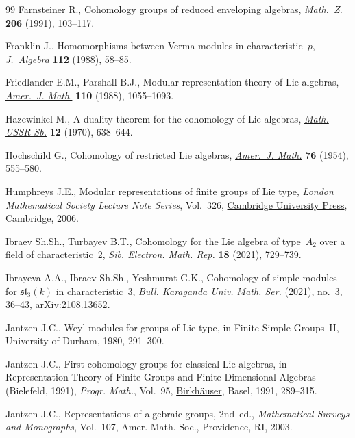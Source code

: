 \documentclass[10pt,a4paper]{amsart}
\numberwithin{equation}{section}
\begin{document}
\begin{thebibliography}{99}
Farnsteiner R., Cohomology groups of reduced enveloping algebras,
 \href{https://doi.org/10.1007/BF02571329}{\textit{Math.~Z.}} \textbf{206} (1991), 103--117.

Franklin J., Homomorphisms between {V}erma modules in characteristic~{$p$},
 \href{https://doi.org/10.1016/0021-8693(88)90132-9}{\textit{J.~Algebra}} \textbf{112} (1988), 58--85.

Friedlander E.M., Parshall B.J., Modular representation theory of {L}ie
 algebras, \href{https://doi.org/10.2307/2374686}{\textit{Amer.~J. Math.}} \textbf{110} (1988), 1055--1093.

Hazewinkel M., A duality theorem for the cohomology of Lie algebras,
 \href{https://doi.org/10.1070/SM1970v012n04ABEH000942}{\textit{Math. USSR-Sb.}} \textbf{12} (1970), 638--644.

Hochschild G., Cohomology of restricted {L}ie algebras, \href{https://doi.org/10.2307/2372701}{\textit{Amer.~J. Math.}}
 \textbf{76} (1954), 555--580.

Humphreys J.E., Modular representations of finite groups of {L}ie type,
 \textit{London Mathematical Society Lecture Note Series}, Vol.~326, \href{https://doi.org/10.1017/CBO9780511525940}{Cambridge
 University Press}, Cambridge, 2006.

Ibraev Sh.Sh., Turbayev B.T., Cohomology for the {L}ie algebra of type~{$A_2$}
 over a field of characteristic~2, \href{https://doi.org/10.33048/semi.2021.18.053}{\textit{Sib. Electron. Math. Rep.}}
 \textbf{18} (2021), 729--739.

Ibrayeva A.A., Ibraev Sh.Sh., Yeshmurat G.K., Cohomology of simple modules for
 $\mathfrak{sl}_3(k)$ in characteristic~$3$, \textit{Bull. Karaganda Univ. Math. Ser.} (2021), no.~3, 36--43, \href{https://arxiv.org/abs/2108.13652}{arXiv:2108.13652}.

Jantzen J.C., Weyl modules for groups of {L}ie type, in Finite Simple
 Groups~{II}, University of Durham, 1980, 291--300.

Jantzen J.C., First cohomology groups for classical {L}ie algebras, in
 Representation Theory of Finite Groups and Finite-Dimensional Algebras
 ({B}ielefeld, 1991), \textit{Progr. Math.}, Vol.~95, \href{https://doi.org/10.1007/978-3-0348-8658-1_11}{Birkh\"auser}, Basel,
 1991, 289--315.

Jantzen J.C., Representations of algebraic groups, 2nd~ed., \textit{Mathematical Surveys
 and Monographs}, Vol.~107, Amer. Math. Soc., Providence, RI, 2003.


\end{thebibliography}
\end{document}
